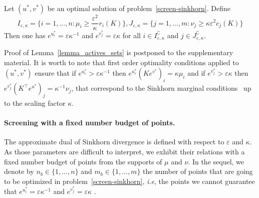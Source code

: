 \begin{lemma}
\label{lemma_actives_sets}
Let $(u^{*}, v^{*})$ be an optimal solution of problem~\eqref{screen-sinkhorn}. 
Define
\begin{equation}
\label{I_epsilon_kappa_J_epsilon_kappa}
I_{\varepsilon,\kappa} = \big\{i=1, \ldots, n: \mu_i \geq \frac {\varepsilon^2} \kappa^{} r_i(K)\big\}, J_{\varepsilon,\kappa} = \big\{j=1, \ldots, m: \nu_j \geq \kappa{\varepsilon^2}{} c_j(K)\big\}
\end{equation}
Then one has $e^{u^{*}_i} = \varepsilon\kappa^{-1}$ and $e^{v^{*}_j} = \varepsilon\kappa$ for all $i \in I^\complement_{\varepsilon,\kappa} $ and $j\in J^\complement_{\varepsilon,\kappa} .$
\end{lemma}

Proof of Lemma~\ref{lemma_actives_sets} is postponed to the supplementary material. It is worth to note that first order optimality conditions applied to $(u^{*}, v^{*})$ ensure that if $e^{u^{*}_i} > \varepsilon\kappa^{-1}$ then $e^{u^{*}_i} (Ke^{v^{*}})_i =  \kappa\mu_i$ and if $e^{v^{*}_j} > \varepsilon\kappa$ then $e^{v^{*}_j} (K^\top e^{u^{*}})_j =  \kappa^{-1}\nu_j$, that correspond to the Sinkhorn marginal conditions~\citep{peyre2019COTnowpublisher} up to the scaling factor $\kappa$. 

\paragraph{Screening with a fixed number budget of points.}
The approximate dual of Sinkhorn divergence is defined with respect to $\varepsilon$ and $\kappa$. {As those parameters are
	difficult to interpret, we exhibit their relations with  a {fixed number budget of points} from the supports of $\mu$ and $\nu$}.
In the sequel, we denote by $n_b \in\{1, \ldots, n\}$ and $m_b\in\{1, \ldots, m\}$ the number of points {that are going to be optimized in problem~\eqref{screen-sinkhorn}, \emph{i.e}, the points we cannot guarantee
that  $e^{u^{*}_i} = \varepsilon\kappa^{-1}$ and $e^{v^{*}_j} = \varepsilon\kappa$ }. 

